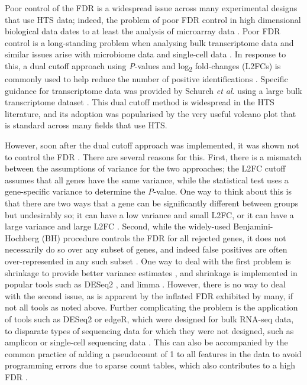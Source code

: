 \documentclass[10pt,letterpaper]{article}
\begin{document}
Poor control of the FDR is a widespread issue across many experimental designs that use HTS data; indeed, the problem of poor FDR control in high dimensional biological data dates to at least the analysis of microarray data \cite{Cui:2003aa}. Poor FDR control is a long-standing problem when analysing bulk transcriptome data \cite{Soneson:2013, li_exaggerated_2022} and similar issues arise with microbiome data \cite{hawinkel2017, Nearing:2022aa} and single-cell data \cite{junttila_benchmarking_2022,squair_confronting_2021}. In response to this, a dual cutoff approach using \textit{P}-values and log\textsubscript{2} fold-changes (L2FCs) is commonly used to help reduce the number of positive identifications \cite{Cui:2003aa}. Specific guidance for transcriptome data was provided by Schurch \textit{et al}. using a large bulk transcriptome dataset \cite{schurch_how_2016}. This dual cutoff method is widespread in the HTS literature, and its adoption was popularised by the very useful volcano plot \cite{Cui:2003aa} that is standard across many fields that use HTS.

However, soon after the dual cutoff approach was implemented, it was shown not to control the FDR \cite{witten2007comparison, Zhang:2009aa}. There are several reasons for this. First, there is a mismatch between the assumptions of variance for the two approaches; the L2FC cutoff assumes that all genes have the same variance, while the statistical test uses a gene-specific variance to determine the \textit{P}-value. One way to think about this is that there are two ways that a gene can be significantly different between groups but undesirably so; it can have a low variance and small L2FC, or it can have a large variance and large L2FC \cite{ebrahimpoor_inflated_2021}. Second, while the widely-used Benjamini-Hochberg \cite{benjamini:1995} (BH) procedure controls the FDR for all rejected genes, it does not necessarily do so over any subset of genes, and indeed false positives are often over-represented in any such subset \cite{Goeman:2014aa, ebrahimpoor_inflated_2021}. One way to deal with the first problem is shrinkage to provide better variance estimates \cite{Zhang:2009aa}, and shrinkage is implemented in popular tools such as DESeq2 \cite{love_moderated_2014}, and limma \cite{ritchie_limma_2015}. However, there is no way to deal with the second issue, as is apparent by the inflated FDR exhibited by many, if not all tools as noted above. Further complicating the problem is the application of tools such as DESeq2 or edgeR, which were designed for bulk RNA-seq data, to disparate types of sequencing data for which they were not designed, such as amplicon or single-cell sequencing data \cite{squair_confronting_2021,junttila_benchmarking_2022,Nearing:2022aa, regueira-iglesias_critical_2023, yang_comprehensive_2022}. This can also be accompanied by the common practice of adding a pseudocount of 1 to all features in the data to avoid programming errors due to sparse count tables, which also contributes to a high FDR \cite{weiss_normalization_2017}.
\end{document}

